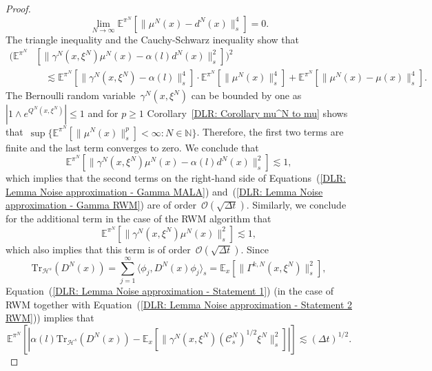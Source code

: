 \begin{proof}
  \begin{equation*}
    \lim_{N \to \infty} \mathbb{E}^{\pi^N}[ \|  \mu^N(x) - d^N(x)\|_{s}^4] = 0.
  \end{equation*} The triangle inequality and the Cauchy-Schwarz inequality show that
  \begin{align*}
   ( \mathbb{E}^{\pi^N} &[  \| \gamma^N(x, \xi^N) \mu^N(x) - \alpha(l) d^N(x)  \|_s^2] )^2 \\
   & \quad \lesssim  \mathbb{E}^{\pi^N}[  \|\gamma^N(x, \xi^N) - \alpha(l)\|_s^4 ] \cdot  \mathbb{E}^{\pi^N}[ \| \mu^N(x)  \|_s^4 ]  +  \mathbb{E}^{\pi^N}[ \| \mu^N(x)  - \mu(x) \|_s^4 ].
  \end{align*}
  The Bernoulli random variable~$\gamma^N(x, \xi^N)$ can be bounded by one as $|1 \wedge e^{Q^N(x, \xi^N)}| \leq 1$ and for $p \geq 1$ Corollary~\ref{DLR: Corollary mu^N to mu} shows that~$\sup \{ \mathbb{E}^{\pi^N}[\| \mu^N(x) \|_s^p] < \infty : N \in \mathbb{N} \}$. Therefore, the first two terms are finite and the last term converges to zero. We conclude that
  \begin{equation}
    \label{DLR: Lemma Noise approximation - Statement 1}
   \mathbb{E}^{\pi^N} [  \| \gamma^N(x, \xi^N) \mu^N(x) - \alpha(l) d^N(x)  \|_s^2] \lesssim 1,
  \end{equation}
  which implies that the second terms on the right-hand side of Equations~(\ref{DLR: Lemma Noise approximation - Gamma MALA}) and~(\ref{DLR: Lemma Noise approximation - Gamma RWM}) are of order~$\mathcal{O}(\sqrt{\Delta t})$. Similarly, we conclude for the additional term in the case of the RWM algorithm that
  \begin{equation}
     \label{DLR: Lemma Noise approximation - Statement 2 RWM}
   \mathbb{E}^{\pi^N} [  \| \gamma^N(x, \xi^N) \mu^N(x) \|_s^2 ] \lesssim 1,
  \end{equation}
  which also implies that this term is of order~$\mathcal{O}(\sqrt{\Delta t})$. Since 
  \begin{equation*}
   \text{Tr}_{\mathcal{H}^s} (D^N(x)) = \sum_{j=1}^{\infty} \langle \phi_j, D^N(x)\phi_j \rangle_s = \mathbb{E}_x[\| \Gamma^{k,N}(x, \xi^N) \|_s^2],
  \end{equation*}
  Equation~(\ref{DLR: Lemma Noise approximation - Statement 1}) (in the case of RWM together with Equation~(\ref{DLR: Lemma Noise approximation - Statement 2 RWM})) implies that
  \begin{equation}
    \mathbb{E}^{\pi^N}[| \alpha(l)  \text{Tr}_{\mathcal{H}^s} (D^N(x)) - \mathbb{E}_x[ \| \gamma^N(x, \xi^N) (\mathcal{C}_s^N)^{1/2} \xi^N \|_s^2] |] \lesssim (\Delta t)^{1/2}.

\end{equation}
\end{proof}
